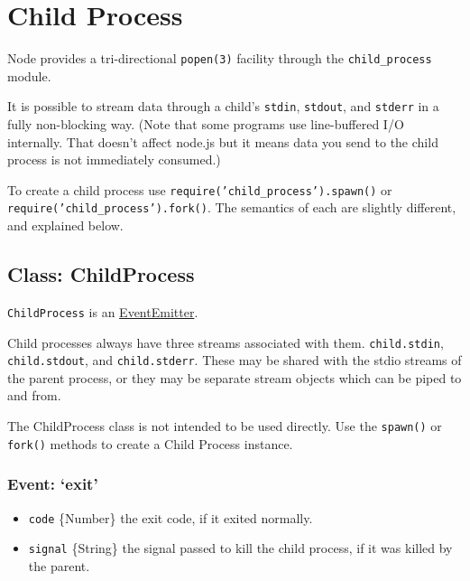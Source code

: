 \section{Child Process}

\begin{Shaded}
\begin{Highlighting}[]
\NormalTok{: } 
\end{Highlighting}
\end{Shaded}

Node provides a tri-directional \texttt{popen(3)} facility through the
\texttt{child\_process} module.

It is possible to stream data through a child's \texttt{stdin},
\texttt{stdout}, and \texttt{stderr} in a fully non-blocking way. (Note
that some programs use line-buffered I/O internally. That doesn't affect
node.js but it means data you send to the child process is not
immediately consumed.)

To create a child process use \texttt{require('child\_process').spawn()}
or \texttt{require('child\_process').fork()}. The semantics of each are
slightly different, and explained below.

\subsection{Class: ChildProcess}

\texttt{ChildProcess} is an
\href{events.html\#events\_class\_events\_eventemitter}{EventEmitter}.

Child processes always have three streams associated with them.
\texttt{child.stdin}, \texttt{child.stdout}, and \texttt{child.stderr}.
These may be shared with the stdio streams of the parent process, or
they may be separate stream objects which can be piped to and from.

The ChildProcess class is not intended to be used directly. Use the
\texttt{spawn()} or \texttt{fork()} methods to create a Child Process
instance.

\subsubsection{Event: `exit'}

\begin{itemize}
\item
  \texttt{code} \{Number\} the exit code, if it exited normally.
\item
  \texttt{signal} \{String\} the signal passed to kill the child
  process, if it was killed by the parent.
\end{itemize}

